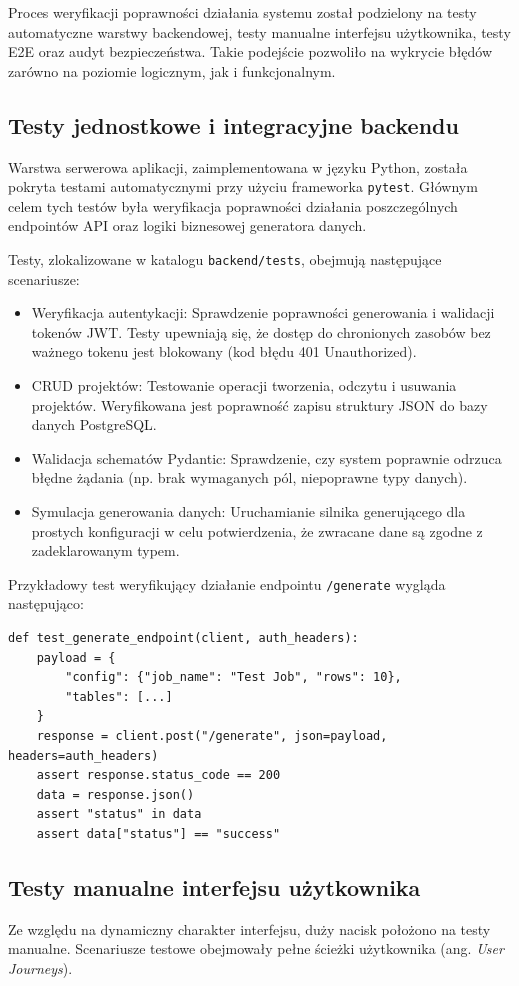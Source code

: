 Proces weryfikacji poprawności działania systemu został podzielony na testy automatyczne warstwy backendowej, testy manualne interfejsu użytkownika, testy \gls{E2E} oraz audyt bezpieczeństwa. Takie podejście pozwoliło na wykrycie błędów zarówno na poziomie logicznym, jak i funkcjonalnym.

\subsection*{Testy jednostkowe i integracyjne backendu}
Warstwa serwerowa aplikacji, zaimplementowana w języku Python, została pokryta testami automatycznymi przy użyciu frameworka \texttt{pytest}. Głównym celem tych testów była weryfikacja poprawności działania poszczególnych endpointów \gls{API} oraz logiki biznesowej generatora danych.

Testy, zlokalizowane w katalogu \texttt{backend/tests}, obejmują następujące scenariusze:
\begin{itemize}
    \item Weryfikacja autentykacji: Sprawdzenie poprawności generowania i walidacji tokenów \gls{JWT}. Testy upewniają się, że dostęp do chronionych zasobów bez ważnego tokenu jest blokowany (kod błędu 401 Unauthorized).
    \item \gls{CRUD} projektów: Testowanie operacji tworzenia, odczytu i usuwania projektów. Weryfikowana jest poprawność zapisu struktury \gls{JSON} do bazy danych PostgreSQL.
    \item Walidacja schematów Pydantic: Sprawdzenie, czy system poprawnie odrzuca błędne żądania (np. brak wymaganych pól, niepoprawne typy danych).
    \item Symulacja generowania danych: Uruchamianie silnika generującego dla prostych konfiguracji w celu potwierdzenia, że zwracane dane są zgodne z zadeklarowanym typem.
\end{itemize}

Przykładowy test weryfikujący działanie endpointu \texttt{/generate} wygląda następująco:
\begin{verbatim}
def test_generate_endpoint(client, auth_headers):
    payload = {
        "config": {"job_name": "Test Job", "rows": 10},
        "tables": [...]
    }
    response = client.post("/generate", json=payload, headers=auth_headers)
    assert response.status_code == 200
    data = response.json()
    assert "status" in data
    assert data["status"] == "success"
\end{verbatim}

\subsection*{Testy manualne interfejsu użytkownika}
Ze względu na dynamiczny charakter interfejsu, duży nacisk położono na testy manualne. Scenariusze testowe obejmowały pełne ścieżki użytkownika (ang. \emph{User Journeys}).

